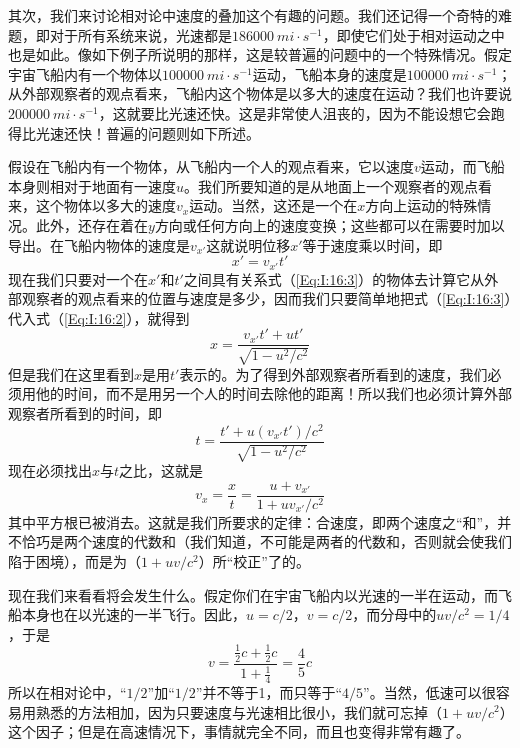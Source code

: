 其次，我们来讨论相对论中速度的叠加这个有趣的问题。我们还记得一个奇特的难题，即对于所有系统来说，光速都是$186000~mi \cdot s^{-1}$，即使它们处于相对运动之中也是如此。像如下例子所说明的那样，这是较普遍的问题中的一个特殊情况。假定宇宙飞船内有一个物体以$100000~mi \cdot s^{-1}$运动，飞船本身的速度是$100000~mi \cdot s^{-1}$；从外部观察者的观点看来，飞船内这个物体是以多大的速度在运动？我们也许要说$200000~mi \cdot s^{-1}$，这就要比光速还快。这是非常使人沮丧的，因为不能设想它会跑得比光速还快！普遍的问题则如下所述。

假设在飞船内有一个物体，从飞船内一个人的观点看来，它以速度$v$运动，而飞船本身则相对于地面有一速度$u$。我们所要知道的是从地面上一个观察者的观点看来，这个物体以多大的速度$v_x$运动。当然，这还是一个在$x$方向上运动的特殊情况。此外，还存在着在$y$方向或任何方向上的速度变换；这些都可以在需要时加以导出。在飞船内物体的速度是$v_{x'}$这就说明位移$x'$等于速度乘以时间，即
\begin{equation}
    \label{Eq:I:16:3}
    x'=v_{x'}t'
\end{equation}
现在我们只要对一个在$x'$和$t'$之间具有关系式（\ref{Eq:I:16:3}）的物体去计算它从外部观察者的观点看来的位置与速度是多少，因而我们只要简单地把式（\ref{Eq:I:16:3}）代入式（\ref{Eq:I:16:2}），就得到
\begin{equation}
    \label{Eq:I:16:4}
    x=\frac{v_{x'}t'+ut'}{\sqrt{1-u^2/c^2}}
\end{equation}
但是我们在这里看到$x$是用$t'$表示的。为了得到外部观察者所看到的速度，我们必须用他的时间，而不是用另一个人的时间去除他的距离！所以我们也必须计算外部观察者所看到的时间，即
\begin{equation}
    \label{Eq:I:16:5}
    t=\frac{t'+u(v_{x'}t')/c^2}{\sqrt{1-u^2/c^2}}
\end{equation}
现在必须找出$x$与$t$之比，这就是
\begin{equation}
    \label{Eq:I:16:6}
    v_x=\frac{x}{t}=\frac{u+v_{x'}}{1+uv_{x'}/c^2}
\end{equation}
其中平方根已被消去。这就是我们所要求的定律：合速度，即两个速度之“和”，并不恰巧是两个速度的代数和（我们知道，不可能是两者的代数和，否则就会使我们陷于困境），而是为（$1+uv/c^2$）所“校正”了的。

现在我们来看看将会发生什么。假定你们在宇宙飞船内以光速的一半在运动，而飞船本身也在以光速的一半飞行。因此，$u=c/2$，$v=c/2$，而分母中的$uv/c^2=1/4$，于是
\begin{equation*}
    v=\frac{\frac{1}{2}c+\frac{1}{2}c}{1+\frac{1}{4}}=\frac{4}{5}c
\end{equation*}
所以在相对论中，“$1/2$”加“$1/2$”并不等于1，而只等于“$4/5$”。当然，低速可以很容易用熟悉的方法相加，因为只要速度与光速相比很小，我们就可忘掉（$1+uv/c^2$）这个因子；但是在高速情况下，事情就完全不同，而且也变得非常有趣了。

